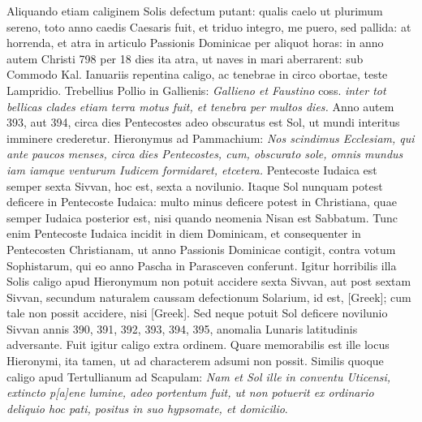 Aliquando etiam caliginem Solis defectum putant:
 qualis caelo ut plurimum
sereno, toto anno caedis Caesaris fuit, et triduo integro, me puero,
sed pallida: at horrenda, et atra in articulo Passionis Dominicae
per aliquot horas: in anno autem Christi 798 per 18 dies ita atra, ut
naves in mari aberrarent: sub Commodo Kal. Ianuariis repentina caligo,
ac tenebrae in circo obortae, teste Lampridio.
Trebellius Pollio in
Gallienis: \textit{Gallieno et Faustino}
 coss. \textit{inter tot bellicas clades etiam terra
motus fuit, et tenebra per multos dies.}
Anno autem 393, aut 394, circa
dies Pentecostes adeo obscuratus est Sol, ut mundi interitus imminere
crederetur.
Hieronymus ad Pammachium: \textit{Nos scindimus Ecclesiam,
qui ante paucos menses, circa dies Pentecostes, cum, obscurato
sole, omnis mundus iam iamque venturum Iudicem formidaret, etcetera.}
Pentecoste Iudaica est semper sexta Sivvan, hoc est, sexta a novilunio.
Itaque Sol nunquam potest deficere in Pentecoste Iudaica: multo minus
deficere potest in Christiana, quae semper Iudaica posterior est, nisi
quando neomenia Nisan est Sabbatum.
Tunc enim Pentecoste Iudaica
incidit in diem Dominicam, et consequenter in Pentecosten Christianam,
ut anno Passionis Dominicae contigit, contra votum Sophistarum,
qui eo anno Pascha in Parasceven conferunt.
Igitur horribilis
illa Solis caligo apud Hieronymum non potuit accidere sexta Sivvan,
aut post sextam Sivvan, secundum naturalem caussam defectionum
Solarium, id est, \textgreek{[Greek]}; cum tale non possit
accidere, nisi \textgreek{[Greek]}.
Sed neque potuit Sol deficere novilunio
Sivvan annis 390, 391, 392, 393, 394, 395, anomalia Lunaris latitudinis
adversante.
Fuit igitur caligo extra ordinem.
Quare memorabilis
est ille locus Hieronymi, ita tamen, ut ad characterem adsumi non
possit.
Similis quoque caligo apud Tertullianum ad Scapulam: \textit{Nam et
Sol ille in conventu Uticensi, extincto p[a]ene lumine, adeo portentum fuit, ut
non potuerit ex ordinario deliquio hoc pati, positus in suo hypsomate, et
domicilio}.
